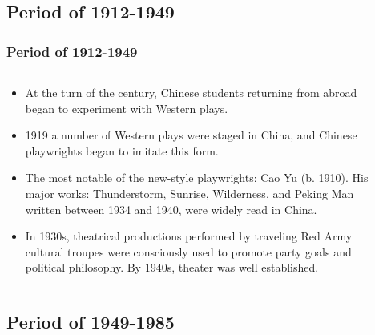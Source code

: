 \documentclass[pdflatex,compress,8pt,
	xcolor={dvipsnames,dvipsnames,svgnames,x11names,table},
	hyperref={	
	breaklinks = true, 
	pdfauthor={Lemenkova Polina}, 
	pdfsubject={Preentation}, 
	pdfcreator={Lemenkova Polina}, 
	pdfproducer={Lemenkova Polina}, 
	colorlinks=true,
	linkcolor=NavyBlue, 
	citecolor=NavyBlue, 
	urlcolor = NavyBlue, 
	breaklinks = true}]{beamer}
\begin{document}
\subsection{Period of 1912-1949}
\begin{frame}\frametitle{Period of 1912-1949}
	\begin{minipage}[0.4\textheight]{\textwidth}
		\begin{columns}[T]
			\begin{column}{0.5\textwidth}
				\vspace{3em} 
				\begin{itemize}
					\item At the turn of the  century, Chinese students returning from abroad began to experiment with Western plays.
					\item 1919 a number of Western plays were staged in China, and Chinese playwrights began to imitate this form.
					\item The most notable of the new-style playwrights: Cao Yu (b. 1910). His major works: Thunderstorm, Sunrise, Wilderness, and Peking Man written between 1934 and 1940, were widely read in China.
					\item In 1930s, theatrical productions performed by traveling Red Army cultural troupes were consciously used to promote party goals and political philosophy. By 1940s, theater was well established.
				\end{itemize}
			\end{column}
			\begin{column}{0.5\textwidth}
						\begin{figure}[H]
				\centering
						\vspace{1mm}
			\end{figure}
			\end{column}
		\end{columns}
	\end{minipage}
\end{frame}

\subsection{Period of 1949-1985}
\end{document}
